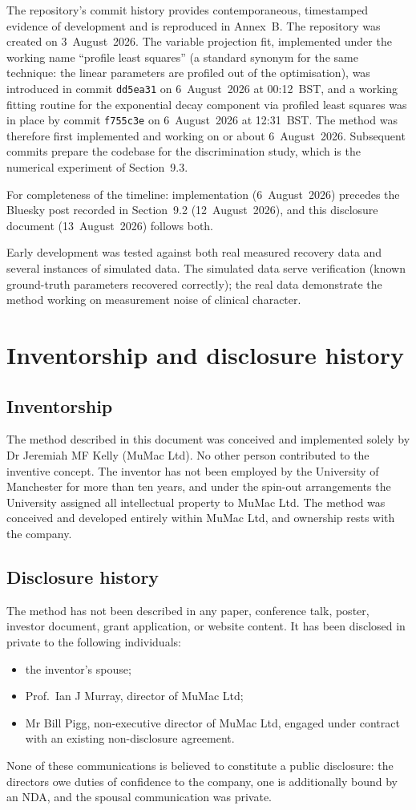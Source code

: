 \documentclass[11pt,a4paper]{article}
\begin{document}
The repository's commit history provides contemporaneous, timestamped
evidence of development and is reproduced in Annex~B. The repository was
created on 3~August~2026. The variable projection fit, implemented under
the working name ``profile least squares'' (a standard synonym for the
same technique: the linear parameters are profiled out of the
optimisation), was introduced in commit \texttt{dd5ea31} on
6~August~2026 at 00:12~BST, and a working fitting routine for the
exponential decay component via profiled least squares was in place by
commit \texttt{f755c3e} on 6~August~2026 at 12:31~BST. The method was
therefore first implemented and working on or about 6~August~2026.
Subsequent commits prepare the codebase for the discrimination study,
which is the numerical experiment of Section~9.3.

For completeness of the timeline: implementation (6~August~2026) precedes
the Bluesky post recorded in Section~9.2 (12~August~2026), and this
disclosure document (13~August~2026) follows both.

Early development was tested against both real measured recovery data and
several instances of simulated data. The simulated data serve verification
(known ground-truth parameters recovered correctly); the real data
demonstrate the method working on measurement noise of clinical
character.

\section{Inventorship and disclosure history}
\subsection{Inventorship}
The method described in this document was conceived and implemented
solely by Dr Jeremiah MF Kelly (MuMac Ltd). No other person contributed
to the inventive concept. The inventor has not been employed by the
University of Manchester for more than ten years, and under the spin-out
arrangements the University assigned all intellectual property to MuMac
Ltd. The method was conceived and developed entirely within MuMac Ltd,
and ownership rests with the company.

\subsection{Disclosure history}
The method has not been described in any paper, conference talk, poster,
investor document, grant application, or website content. It has been
disclosed in private to the following individuals:
\begin{itemize}[nosep]
\item the inventor's spouse;
\item Prof.\ Ian J Murray, director of MuMac Ltd;
\item Mr Bill Pigg, non-executive director of MuMac Ltd, engaged under
  contract with an existing non-disclosure agreement.
\end{itemize}
None of these communications is believed to constitute a public
disclosure: the directors owe duties of confidence to the company, one is
additionally bound by an NDA, and the spousal communication was private.
\end{document}
